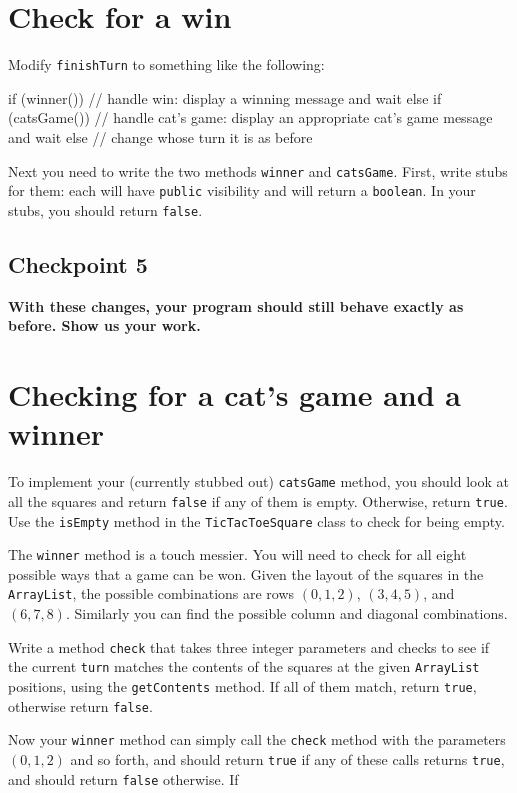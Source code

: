 \documentclass[12pt]{article}
\newenvironment{qv}%
  {\quote
   \verbatim}%
  {\endverbatim
   \endquote}
\newcommand{\code}{\texttt}
\begin{document}
\section*{Check for a win}

Modify \code{finishTurn} to something like the
following:

\begin{qv}
  if (winner()) {
    // handle win: display a winning message and wait
  } else if (catsGame()) {
    // handle cat's game: display an appropriate cat's game message and wait
  } else {
    // change whose turn it is as before
  }
\end{qv}

Next you need to write the two methods \code{winner} and \code{catsGame}.
First, write stubs for them:
each will have \code{public} visibility and will return a \code{boolean}.
In your stubs, you should return \code{false}.

\subsection*{Checkpoint 5}
{\bf
With these changes, your program should still behave exactly as before.
Show us your work.
}

\section*{Checking for a cat's game and a winner}

To implement your (currently stubbed out) \code{catsGame} method,
you should look at all the squares and return \code{false}
if any of them is empty.
Otherwise, return \code{true}.
Use the \code{isEmpty} method in the \code{TicTacToeSquare} class
to check for being empty.

The \code{winner} method is a touch messier.
You will need to check for all eight possible ways
that a game can be won.
Given the layout of the squares in the \code{ArrayList},
the possible combinations are
rows $(0, 1, 2)$, $(3, 4, 5)$, and $(6, 7, 8)$.
Similarly you can find the possible column and diagonal combinations.

Write a method \code{check} that takes three integer parameters
and checks to see if the current \code{turn}
matches the contents of the squares at the given \code{ArrayList} positions,
using the \code{getContents} method.
If all of them match, return \code{true},
otherwise return \code{false}.

Now your \code{winner} method can simply call the \code{check} method
with the parameters $(0, 1, 2)$ and so forth,
and should return \code{true} if any of these calls returns \code{true},
and should return \code{false} otherwise.
If \
\end{document}
